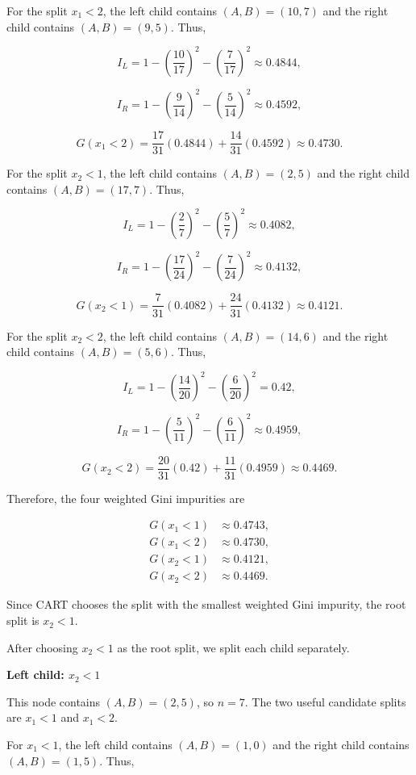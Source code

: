\documentclass{article}
\begin{document}
For the split $x_1<2$, the left child contains $(A,B)=(10,7)$ and the right child contains $(A,B)=(9,5)$. Thus,

$$
I_L
=
1-\left(\frac{10}{17}\right)^2-\left(\frac{7}{17}\right)^2
\approx
0.4844,
$$

$$
I_R
=
1-\left(\frac{9}{14}\right)^2-\left(\frac{5}{14}\right)^2
\approx
0.4592,
$$

$$
G(x_1<2)
=
\frac{17}{31}(0.4844)
+
\frac{14}{31}(0.4592)
\approx
0.4730.
$$

For the split $x_2<1$, the left child contains $(A,B)=(2,5)$ and the right child contains $(A,B)=(17,7)$. Thus,

$$
I_L
=
1-\left(\frac{2}{7}\right)^2-\left(\frac{5}{7}\right)^2
\approx
0.4082,
$$

$$
I_R
=
1-\left(\frac{17}{24}\right)^2-\left(\frac{7}{24}\right)^2
\approx
0.4132,
$$

$$
G(x_2<1)
=
\frac{7}{31}(0.4082)
+
\frac{24}{31}(0.4132)
\approx
0.4121.
$$

For the split $x_2<2$, the left child contains $(A,B)=(14,6)$ and the right child contains $(A,B)=(5,6)$. Thus,

$$
I_L
=
1-\left(\frac{14}{20}\right)^2-\left(\frac{6}{20}\right)^2
=
0.42,
$$

$$
I_R
=
1-\left(\frac{5}{11}\right)^2-\left(\frac{6}{11}\right)^2
\approx
0.4959,
$$

$$
G(x_2<2)
=
\frac{20}{31}(0.42)
+
\frac{11}{31}(0.4959)
\approx
0.4469.
$$

Therefore, the four weighted Gini impurities are

$$
\begin{aligned}
G(x_1<1) &\approx 0.4743,\\
G(x_1<2) &\approx 0.4730,\\
G(x_2<1) &\approx 0.4121,\\
G(x_2<2) &\approx 0.4469.
\end{aligned}
$$

Since CART chooses the split with the smallest weighted Gini impurity, the root split is $
\boxed{x_2<1}.
$


After choosing $x_2<1$ as the root split, we split each child separately.

\vspace{5mm} 
\textbf{Left child: $x_2<1$
}


This node contains $(A,B)=(2,5)$, so $n=7$. The two useful candidate splits are $x_1<1$ and $x_1<2$.

For $x_1<1$, the left child contains $(A,B)=(1,0)$ and the right child contains $(A,B)=(1,5)$. Thus,
\end{document}
